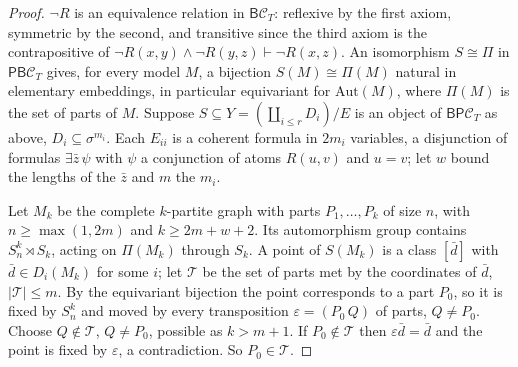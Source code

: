 \documentclass[11pt]{amsart}
\theoremstyle{definition}
\newcommand{\PP}{\mathsf P}
\newcommand{\BB}{\mathsf B}
\newcommand{\cC}{\mathcal C}
\begin{document}
\begin{proof}
$\neg R$ is an equivalence relation in $\BB\cC_T$: reflexive by the first
axiom, symmetric by the second, and transitive since the third axiom
is the contrapositive of $\neg R(x,y)\wedge\neg R(y,z)\vdash\neg R(x,z)$.
An isomorphism $S\cong\Pi$ in $\PP\BB\cC_T$ gives, for every model $M$,
a bijection $S(M)\cong\Pi(M)$ natural in elementary embeddings, in
particular equivariant for $\mathrm{Aut}(M)$, where $\Pi(M)$ is the set
of parts of $M$. Suppose $S\subseteq Y=(\coprod_{i\le r}D_i)/E$ is an
object of $\BB\PP\cC_T$ as above, $D_i\subseteq\sigma^{m_i}$. Each
$E_{ii}$ is a coherent formula in $2m_i$ variables, a disjunction of
formulas $\exists\bar z\,\psi$ with $\psi$ a conjunction of atoms $R(u,v)$
and $u=v$; let $w$ bound the lengths of the $\bar z$ and $m$ the $m_i$.

Let $M_k$ be the complete $k$-partite graph with parts $P_1,\dots,P_k$
of size $n$, with $n\ge\max(1,2m)$ and $k\ge 2m+w+2$. Its automorphism group
contains $S_n^k\rtimes S_k$, acting on $\Pi(M_k)$ through $S_k$. A point
of $S(M_k)$ is a class $[\bar d]$ with $\bar d\in D_i(M_k)$ for some $i$;
let $\mathcal T$ be the set of parts met by the coordinates of $\bar d$,
$|\mathcal T|\le m$. By the equivariant bijection the point corresponds
to a part $P_0$, so it is fixed by $S_n^k$ and moved by every
transposition $\varepsilon=(P_0\,Q)$ of parts, $Q\ne P_0$. Choose
$Q\notin\mathcal T$, $Q\ne P_0$, possible as $k>m+1$. If $P_0\notin\mathcal T$ then
$\varepsilon\bar d=\bar d$ and the point is fixed by $\varepsilon$, a
contradiction. So $P_0\in\mathcal T$.


\end{proof}
\end{document}
